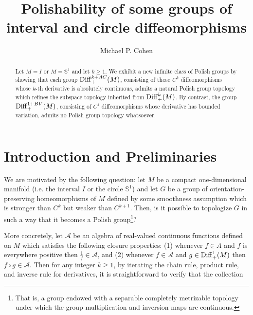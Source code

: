 \documentclass[12pt]{amsart}
\theoremstyle{definition}
\theoremstyle{remark}
\newcommand{\Diff}{\mathop{\rm Diff}}
\begin{document}
\author{Michael P. Cohen}
\address{Michael P. Cohen,
Department of Mathematics,
North Dakota State University,
PO Box 6050,
Fargo, ND, 58108-6050}

\title{Polishability of some groups of interval and circle diffeomorphisms}

\begin{abstract}  Let $M=I$ or $M=\mathbb{S}^1$ and let $k\geq 1$.  We exhibit a new infinite class of Polish groups by showing that each group $\Diff_+^{k+AC}(M)$, consisting of those $C^k$ diffeomorphisms whose $k$-th derivative is absolutely continuous, admits a natural Polish group topology which refines the subspace topology inherited from $\Diff_+^k(M)$.  By contrast, the group $\Diff_+^{1+BV}(M)$, consisting of $C^1$ diffeomorphisms whose derivative has bounded variation, admits no Polish group topology whatsoever.
\end{abstract}

\maketitle


\section{Introduction and Preliminaries}

We are motivated by the following question: let $M$ be a compact one-dimensional manifold (i.e. the interval $I$ or the circle $\mathbb{S}^1$) and let $G$ be a group of orientation-preserving homeomorphisms of $M$ defined by some smoothness assumption which is stronger than $C^k$ but weaker than $C^{k+1}$.  Then, is it possible to topologize $G$ in such a way that it becomes a Polish group\footnote{That is, a group endowed with a separable completely metrizable topology under which the group multiplication and inversion maps are continuous.}?

More concretely, let $\mathcal{A}$ be an algebra of real-valued continuous functions defined on $M$ which satisfies the following closure properties: (1) whenever $f\in A$ and $f$ is everywhere positive then $\frac{1}{f}\in\mathcal{A}$, and (2) whenever $f\in \mathcal{A}$ and $g\in\Diff_+^1(M)$ then $f\circ g\in\mathcal{A}$.  Then for any integer $k\geq 1$, by iterating the chain rule, product rule, and inverse rule for derivatives, it is straightforward to verify that the collection\\
\end{document}
